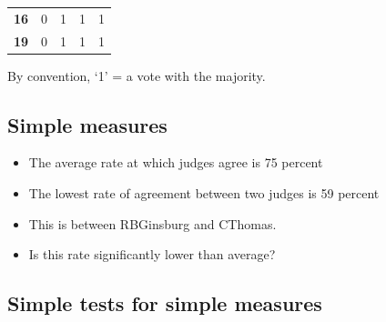 \documentclass[12pt,twoside]{article}
\providecommand{\tightlist}{%
  \setlength{\itemsep}{0pt}\setlength{\parskip}{0pt}}
\begin{document}
\begin{longtable}[c]{@{}ccccc@{}}
\begin{minipage}[t]{0.11\columnwidth}
\textbf{16}
\strut\end{minipage} &
\begin{minipage}[t]{0.16\columnwidth}\centering\strut
0
\strut\end{minipage} &
\begin{minipage}[t]{0.12\columnwidth}\centering\strut
1
\strut\end{minipage} &
\begin{minipage}[t]{0.13\columnwidth}\centering\strut
1
\strut\end{minipage} &
\begin{minipage}[t]{0.14\columnwidth}\centering\strut
1
\strut\end{minipage}\tabularnewline
\begin{minipage}[t]{0.11\columnwidth}\centering\strut
\textbf{19}
\strut\end{minipage} &
\begin{minipage}[t]{0.16\columnwidth}\centering\strut
0
\strut\end{minipage} &
\begin{minipage}[t]{0.12\columnwidth}\centering\strut
1
\strut\end{minipage} &
\begin{minipage}[t]{0.13\columnwidth}\centering\strut
1
\strut\end{minipage} &
\begin{minipage}[t]{0.14\columnwidth}\centering\strut
1
\strut\end{minipage}\tabularnewline
\bottomrule
\end{longtable}

By convention, `1' = a vote with the majority.

\subsection{Simple measures}\label{simple-measures}

\begin{itemize}
\tightlist
\item
  The average rate at which judges agree is 75 percent
\item
  The lowest rate of agreement between two judges is 59 percent
\item
  This is between RBGinsburg and CThomas.
\item
  Is this rate significantly lower than average?
\end{itemize}

\subsection{Simple tests for simple
measures}\label{simple-tests-for-simple-measures}
\end{document}
